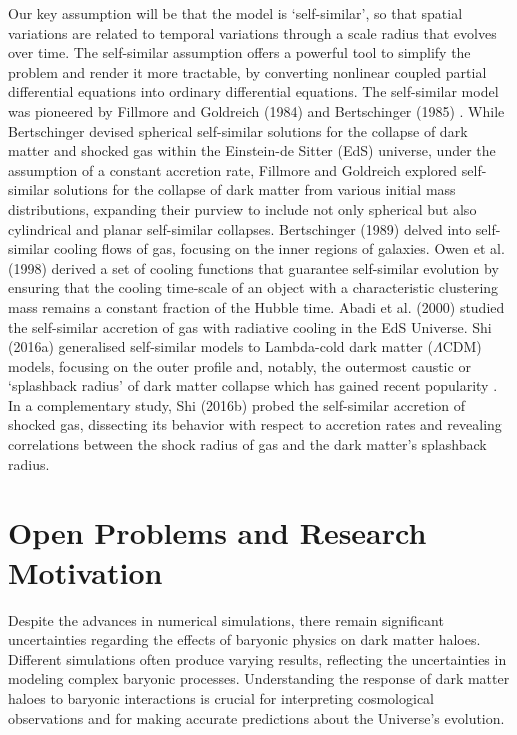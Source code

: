 Our key assumption will be that the model is `self-similar', so that spatial variations are related to temporal variations through a scale radius that evolves over time. The self-similar assumption offers a powerful tool to simplify the problem and render it more tractable, by converting nonlinear coupled partial differential equations into ordinary differential equations. The self-similar model was pioneered by Fillmore and Goldreich (1984) \cite{1984FillmoreGoldreich} and Bertschinger (1985) \cite{1985Bertschinger}. While Bertschinger devised spherical self-similar solutions for the collapse of dark matter and shocked gas within the Einstein-de Sitter (EdS) universe, under the assumption of a constant accretion rate, Fillmore and Goldreich explored self-similar solutions for the collapse of dark matter from various initial mass distributions, expanding their purview to include not only spherical but also cylindrical and planar self-similar collapses. Bertschinger (1989) \cite{1989Bertschinger} delved into self-similar cooling flows of gas, focusing on the inner regions of galaxies. Owen et al. (1998) \cite{1998OwenWeinberg_etal} derived a set of cooling functions that guarantee self-similar evolution by ensuring that the cooling time-scale of an object with a characteristic clustering mass remains a constant fraction of the Hubble time. Abadi et al. (2000) \cite{2000Abadi_etal_SelfSimCool} studied the self-similar accretion of gas with radiative cooling in the EdS Universe. Shi (2016a) \cite{2016ShiDMLamCDM} generalised self-similar models to Lambda-cold dark matter ($\Lambda$CDM) models, focusing on the outer profile and, notably, the outermost caustic or `splashback radius' of dark matter collapse which has gained recent popularity \cite{2014DiemerKrastov,2014AdhikariDalalChamberlain,2018Changetal_DES_splashback}.
In a complementary study, Shi (2016b) \cite{2016ShiICM} probed the self-similar accretion of shocked gas, dissecting its behavior with respect to accretion rates and revealing correlations between the shock radius of gas and the dark matter's splashback radius.

\section{Open Problems and Research Motivation}

Despite the advances in numerical simulations, there remain significant uncertainties regarding the effects of baryonic physics on dark matter haloes. Different simulations often produce varying results, reflecting the uncertainties in modeling complex baryonic processes. Understanding the response of dark matter haloes to baryonic interactions is crucial for interpreting cosmological observations and for making accurate predictions about the Universe's evolution.

